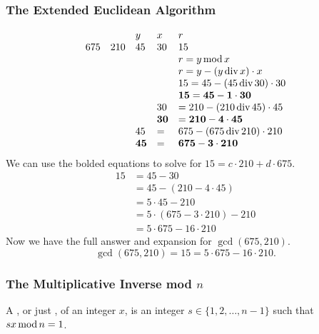 \subsubsection*{The Extended Euclidean Algorithm}
\[
  \begin{array}{lllll}
        &     & y           & x           & r                                \\
    675 & 210 & 45          & 30          & 15                               \\
        &     &             &             & r = y \operatorname{\text{mod}} x                    \\
        &     &             &             & r = y - (y \operatorname{\text{div}} x) \cdot x      \\
        &     &             &             & 15 = 45 - (45 \operatorname{\text{div}} 30) \cdot 30 \\
        &     &             &             & \mathbf{15 = 45 - 1 \cdot 30}    \\
        &     &             & 30          & = 210 - (210 \operatorname{\text{div}} 45) \cdot 45  \\
        &     &             & \mathbf{30} & \mathbf{= 210 - 4 \cdot 45}      \\
        &     & 45          & =           & 675 - (675 \operatorname{\text{div}} 210) \cdot 210  \\
        &     & \mathbf{45} & \mathbf{=}  & \mathbf{675 - 3 \cdot 210}
  \end{array}
\]
We can use the bolded equations to solve for $15 = c \cdot 210 + d \cdot 675$.
\begin{align*}
  15 & = 45 - 30                           \\
     & = 45 - (210 - 4 \cdot 45)           \\
     & = 5 \cdot 45 - 210                  \\
     & = 5 \cdot (675 - 3 \cdot 210) - 210 \\
     & = 5 \cdot 675 - 16 \cdot 210
\end{align*}
Now we have the full answer and expansion for $\gcd(675,210)$.
\[
  \gcd(675,210) = 15 = 5 \cdot 675 - 16 \cdot 210.
\]

\subsubsection*{The Multiplicative Inverse mod $n$}
A , or just , of an integer $x$, is an integer $s \in \{1,2,\ldots,n-1\}$ such that $sx \operatorname{\text{mod}} n = 1$.

